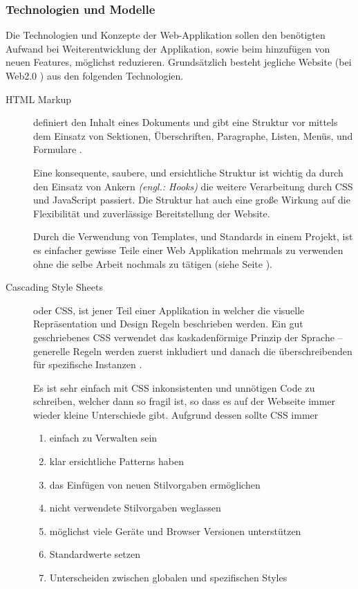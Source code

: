 \subsubsection{Technologien und Modelle}

Die Technologien und Konzepte der Web-Applikation sollen den benötigten Aufwand bei Weiterentwicklung der Applikation, sowie beim hinzufügen von neuen Features, möglichst reduzieren. Grundsätzlich besteht jegliche Website (bei Web2.0 \cite{MELD.CH3-web-app.web2}) aus den folgenden Technologien.

\begin{description}
\item[HTML Markup \newline] \label{html} definiert den Inhalt eines Dokuments und gibt eine Struktur vor mittels dem Einsatz von Sektionen, Überschriften, Paragraphe, Listen, Menüs, und Formulare \cite{MELD.CH3-web-app.html}.

Eine konsequente, saubere, und ersichtliche Struktur ist wichtig da durch den Einsatz von Ankern \textit{(engl.: Hooks)} die weitere Verarbeitung durch CSS und JavaScript passiert. Die Struktur hat auch eine große Wirkung auf die Flexibilität und zuverlässige Bereitstellung der Website.

Durch die Verwendung von Templates, und Standards in einem Projekt, ist es einfacher gewisse Teile einer Web Applikation mehrmals zu verwenden ohne die selbe Arbeit nochmals zu tätigen (siehe Seite \pageref{subsec:jsframeworks}).

\item[Cascading Style Sheets\newline] oder CSS, ist jener Teil einer Applikation in welcher die visuelle Repräsentation und Design Regeln beschrieben werden. Ein gut geschriebenes CSS verwendet das kaskadenförmige Prinzip der Sprache – generelle Regeln werden zuerst inkludiert und danach die überschreibenden für spezifische Instanzen \cite{MELD.CH3-web-app.css}.

Es ist sehr einfach mit CSS inkonsistenten und unnötigen Code zu schreiben, welcher dann so fragil ist, so dass es auf der Webseite immer wieder kleine Unterschiede gibt. Aufgrund dessen sollte CSS immer \cite{MELD.CH3-web-app.css2}
\begin{enumerate}
\item einfach zu Verwalten sein
\item klar ersichtliche Patterns haben
\item das Einfügen von neuen Stilvorgaben ermöglichen
\item nicht verwendete Stilvorgaben weglassen
\item möglichst viele Geräte und Browser Versionen unterstützen
\item Standardwerte setzen
\item Unterscheiden zwischen globalen und spezifischen Styles
\end{enumerate}


\end{description}
